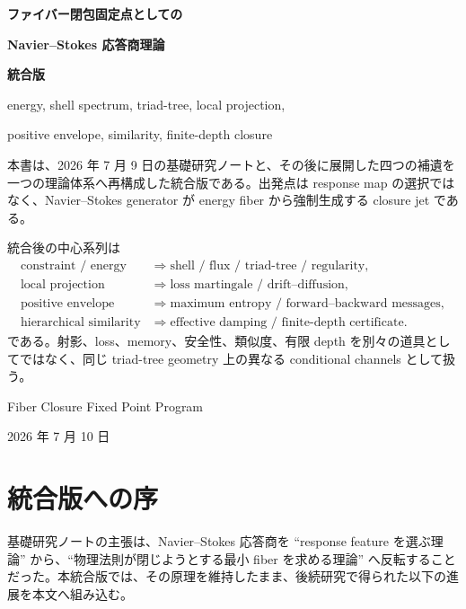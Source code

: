 \documentclass[11pt,a4paper,openany]{book}
\numberwithin{equation}{chapter}
\begin{document}
\frontmatter
\begin{titlepage}
\centering
\vspace*{13mm}
{\sffamily\bfseries\Huge ファイバー閉包固定点としての\par}
\vspace{3mm}
{\sffamily\bfseries\Huge Navier--Stokes 応答商理論\par}
\vspace{6mm}
{\sffamily\bfseries\LARGE 統合版\par}
\vspace{9mm}
{\Large energy, shell spectrum, triad-tree, local projection,\par}
{\Large positive envelope, similarity, finite-depth closure\par}
\vspace{13mm}
\begin{tcolorbox}[width=0.91\textwidth,colback=softblue,colframe=deepblue,boxrule=0.7pt,arc=1mm]
本書は、2026 年 7 月 9 日の基礎研究ノートと、その後に展開した四つの補遺を一つの理論体系へ再構成した統合版である。出発点は response map の選択ではなく、Navier--Stokes generator が energy fiber から強制生成する closure jet である。

統合後の中心系列は
\[
\boxed{
\begin{aligned}
\text{constraint / energy}
&\Rightarrow\text{shell / flux / triad-tree / regularity},\\
\text{local projection}
&\Rightarrow\text{loss martingale / drift--diffusion},\\
\text{positive envelope}
&\Rightarrow\text{maximum entropy / forward--backward messages},\\
\text{hierarchical similarity}
&\Rightarrow\text{effective damping / finite-depth certificate}.
\end{aligned}}
\]
である。射影、loss、memory、安全性、類似度、有限 depth を別々の道具としてではなく、同じ triad-tree geometry 上の異なる conditional channels として扱う。
\end{tcolorbox}
\vfill
{\large Fiber Closure Fixed Point Program\par}
\vspace{3mm}
{\large 2026 年 7 月 10 日\par}
\end{titlepage}

\chapter*{統合版への序}
基礎研究ノートの主張は、Navier--Stokes 応答商を ``response feature を選ぶ理論'' から、``物理法則が閉じようとする最小 fiber を求める理論'' へ反転することだった。本統合版では、その原理を維持したまま、後続研究で得られた以下の進展を本文へ組み込む。
\end{document}
